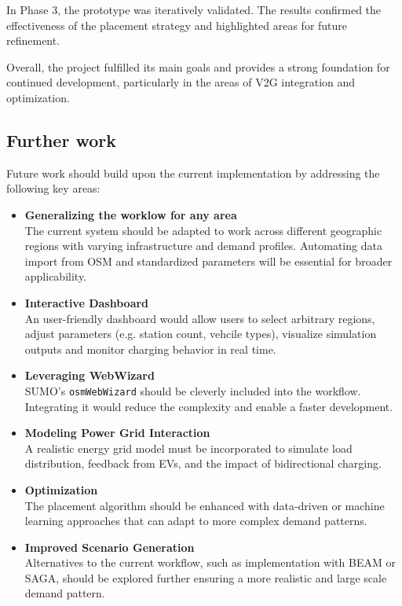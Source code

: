 In Phase 3, the prototype was iteratively validated. The results confirmed the effectiveness of the placement strategy and highlighted areas for future refinement.

Overall, the project fulfilled its main goals and provides a strong foundation for continued development, particularly in the areas of V2G integration and optimization.

\subsection{Further work}
Future work should build upon the current implementation by addressing the following key areas:
\begin{itemize}
    \item \textbf{Generalizing the worklow for any area}\\
    The current system should be adapted to work across different geographic regions with varying infrastructure and demand profiles. Automating data import from OSM and standardized parameters will be essential for broader applicability.
    \item \textbf{Interactive Dashboard}\\
    An user-friendly dashboard would allow users to select arbitrary regions, adjust parameters (e.g. station count, vehcile types), visualize simulation outputs and monitor charging behavior in real time.
    \item \textbf{Leveraging WebWizard}\\
    SUMO's \texttt{osmWebWizard} should be cleverly included into the workflow. Integrating it would reduce the complexity and enable a faster development.
    \item \textbf{Modeling Power Grid Interaction}\\
    A realistic energy grid model must be incorporated to simulate load distribution, feedback from EVs, and the impact of bidirectional charging.
    \item \textbf{Optimization}\\
    The placement algorithm should be enhanced with data-driven or machine learning approaches that can adapt to more complex demand patterns.
    \item \textbf{Improved Scenario Generation}\\
    Alternatives to the current workflow, such as implementation with BEAM or SAGA, should be explored further ensuring a more realistic and large scale demand pattern.    
\end{itemize}
